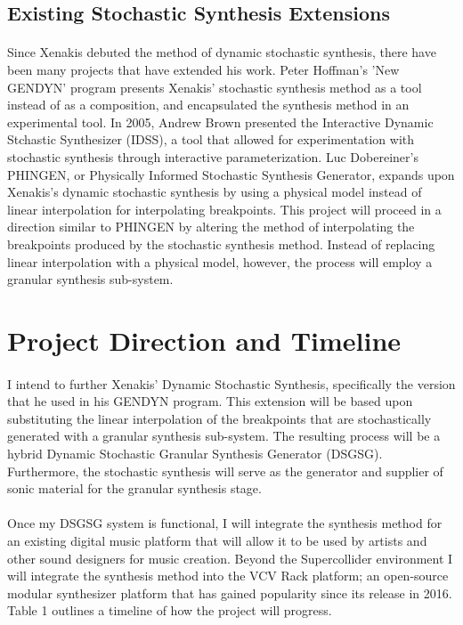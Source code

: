 \documentclass{article}
\begin{document}
\subsection{Existing Stochastic Synthesis Extensions}
\paragraph{}
Since Xenakis debuted the method of dynamic stochastic synthesis, there have been many projects that have extended his work. Peter Hoffman's 'New GENDYN' program presents Xenakis' stochastic synthesis method as a tool instead of as a composition, and encapsulated the synthesis method in an experimental tool.\citep{hoffman2000} In 2005, Andrew Brown presented the Interactive Dynamic Stchastic Synthesizer (IDSS), a tool that allowed for experimentation with stochastic synthesis through interactive parameterization.\citep{brown2005} Luc Dobereiner's PHINGEN, or Physically Informed Stochastic Synthesis Generator, expands upon Xenakis's dynamic stochastic synthesis by using a physical model instead of linear interpolation for interpolating breakpoints.\citep{lucICMC} This project will proceed in a direction similar to PHINGEN by altering the method of interpolating the breakpoints produced by the stochastic synthesis method. Instead of replacing linear interpolation with a physical model, however, the process will employ a granular synthesis sub-system.

\section{Project Direction and Timeline}
\paragraph{}
I intend to further Xenakis' Dynamic Stochastic Synthesis, specifically the version that he used in his GENDYN program. This extension will be based upon substituting the linear interpolation of the breakpoints that are stochastically generated with a granular synthesis sub-system. The resulting process will be a hybrid Dynamic Stochastic Granular Synthesis Generator (DSGSG). Furthermore, the stochastic synthesis will serve as the generator and supplier of sonic material for the granular synthesis stage.
\paragraph{}
Once my DSGSG system is functional, I will integrate the synthesis method for an existing digital music platform that will allow it to be used by artists and other sound designers for music creation. Beyond the Supercollider environment I will integrate the synthesis method into the VCV Rack platform; an open-source modular synthesizer platform that has gained popularity since its release in 2016. Table 1 outlines a timeline of how the project will progress.\citep{vcvrack}
\end{document}
